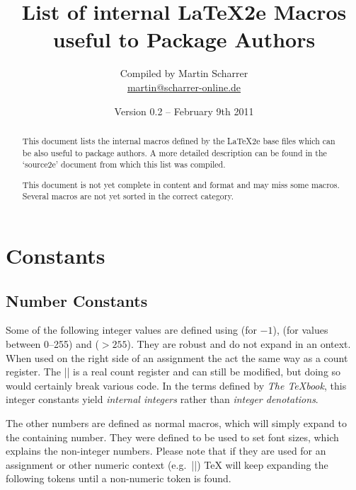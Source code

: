 \documentclass[12pt,a4paper]{article}
\title{List of internal \LaTeX2e Macros useful to Package Authors}
\author{Compiled by Martin Scharrer\\\url{martin@scharrer-online.de}}
\date{Version 0.2 -- February 9th 2011}
\begin{document}
\maketitle
\begin{abstract}
This document lists the internal macros defined by the \LaTeX2e base files which can be also useful
to package authors.  A more detailed description can be found in the `source2e' document from which
this list was compiled.

This document is not yet complete in content and format and may miss some macros. Several macros are
not yet sorted in the correct category.
\end{abstract}

\tableofcontents

\clearpage

\section{Constants}

\subsection{Number Constants}

Some of the following integer values are defined using \Macro\countdef\relax (for $-1$),
\Macro\chardef\relax (for values between 0--255) and \Macro\mathchardef\relax ($>255$).  They are
robust and do not expand in an \Macro\edef\relax context. When used on the right side of an
assignment the act the same way as a count register.  The |\m@ne| is a real count register and can
still be modified, but doing so would certainly break various code.  In the terms defined by
\emph{The TeXbook}, this integer constants yield \emph{internal integers} rather than \emph{integer
denotations}.

The other numbers are defined as normal macros, which will simply expand to the containing number.
They were defined
to be used to set font sizes, which explains the non-integer numbers.  Please note that if they
are used for an assignment or other numeric context (e.g.\ |\ifnum|) TeX will keep expanding the
following tokens until a non-numeric token is found.%
\end{document}
